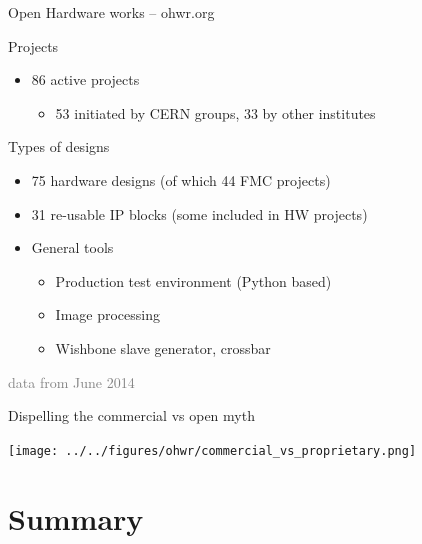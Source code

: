 \documentclass[compress,red]{beamer}
\begin{document}
\begin{frame}{Open Hardware works -- ohwr.org}
	\begin{block}{Projects}
   \begin{itemize}
	\item 86 active projects
	\begin{itemize}
		\item 53 initiated by CERN groups, 33 by other institutes
	   \end{itemize}
   \end{itemize}
	\end{block}

\begin{block}{Types of designs}
\begin{itemize}
	\item 75 hardware designs (of which 44 FMC projects)
	\item 31 re-usable IP blocks (some included in HW projects)
	\item General tools
	\begin{itemize}
		\item Production test environment (Python based)
		\item Image processing
		\item Wishbone slave generator, crossbar
	\end{itemize}
   \end{itemize}
	\end{block}
\textcolor{gray}{data from June 2014}
\end{frame}




\begin{frame}{Dispelling the commercial vs open myth}
 \begin{center}
   \texttt{[image: ../../figures/ohwr/commercial\_vs\_proprietary.png]}
 \end{center} 
\end{frame}



\section{Summary}
\end{document}

